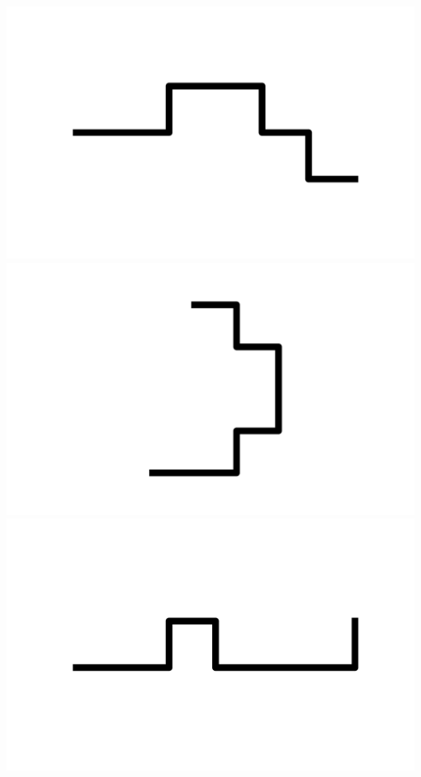 \documentclass[]{report}
\begin{document}
\includegraphics[scale=.1]{pictures/21/state_cluster_shapes_316.pdf} 
\includegraphics[scale=.1]{pictures/21/state_cluster_shapes_317.pdf} 
\includegraphics[scale=.1]{pictures/21/state_cluster_shapes_318.pdf} 
\end{document}
